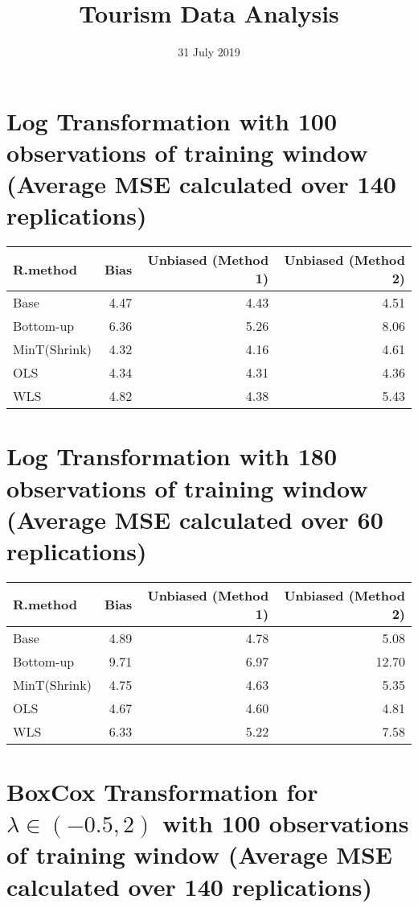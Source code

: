 \documentclass[]{article}
\title{Tourism Data Analysis}
\author{}
\date{31 July 2019}
\begin{document}
\maketitle

\section{Log Transformation with 100 observations of training window
(Average MSE calculated over 140
replications)}\label{log-transformation-with-100-observations-of-training-window-average-mse-calculated-over-140-replications}

\begin{tabular}{l|r|r|r}
\hline
R.method & Bias & Unbiased (Method 1) & Unbiased (Method 2)\\
\hline
Base & 4.47 & 4.43 & 4.51\\
\hline
Bottom-up & 6.36 & 5.26 & 8.06\\
\hline
MinT(Shrink) & 4.32 & 4.16 & 4.61\\
\hline
OLS & 4.34 & 4.31 & 4.36\\
\hline
WLS & 4.82 & 4.38 & 5.43\\
\hline
\end{tabular}

\section{Log Transformation with 180 observations of training window
(Average MSE calculated over 60
replications)}\label{log-transformation-with-180-observations-of-training-window-average-mse-calculated-over-60-replications}

\begin{tabular}{l|r|r|r}
\hline
R.method & Bias & Unbiased (Method 1) & Unbiased (Method 2)\\
\hline
Base & 4.89 & 4.78 & 5.08\\
\hline
Bottom-up & 9.71 & 6.97 & 12.70\\
\hline
MinT(Shrink) & 4.75 & 4.63 & 5.35\\
\hline
OLS & 4.67 & 4.60 & 4.81\\
\hline
WLS & 6.33 & 5.22 & 7.58\\
\hline
\end{tabular}

\section{\texorpdfstring{BoxCox Transformation for
\(\lambda \in (-0.5,2)\) with 100 observations of training window
(Average MSE calculated over 140
replications)}{BoxCox Transformation for \textbackslash{}lambda \textbackslash{}in (-0.5,2) with 100 observations of training window (Average MSE calculated over 140 replications)}}\label{boxcox-transformation-for-lambda-in--0.52-with-100-observations-of-training-window-average-mse-calculated-over-140-replications}
\end{document}
